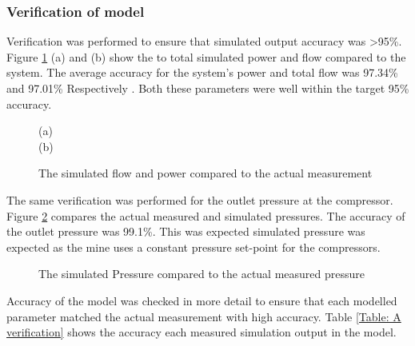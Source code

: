 \subsubsection{Verification of model}
Verification was performed to ensure that simulated output accuracy was >95\%. Figure \ref{fig: Verification Power+flow Beatrix} (a) and (b) show the to total simulated power and flow compared to the  system. The average accuracy for the system's power and total flow was 97.34\%  and  97.01\% Respectively . Both these parameters were well within the target 95\% accuracy.
\begin{figure}[h!]
	\centering
	
	(a)\\
	
	(b)\\
	\caption{The simulated flow and power compared to the actual measurement}
	\label{fig: Verification Power+flow Beatrix}
\end{figure}
The same verification was performed for the outlet pressure at the compressor. Figure \ref{fig: Verification Pressure Beatrix} compares the actual measured and simulated pressures. The accuracy of the outlet pressure was 99.1\%. This was expected simulated pressure was expected as the mine uses a constant pressure set-point for the compressors.
\begin{figure}[h!]
	\centering
	
	\caption{The simulated Pressure compared to the actual measured pressure}
	\label{fig: Verification Pressure Beatrix}
\end{figure}
\par
Accuracy of the model was checked in more detail to ensure that each modelled parameter matched the actual measurement with high accuracy. Table \ref{Table: A verification} shows the accuracy each measured simulation output in the model. 
